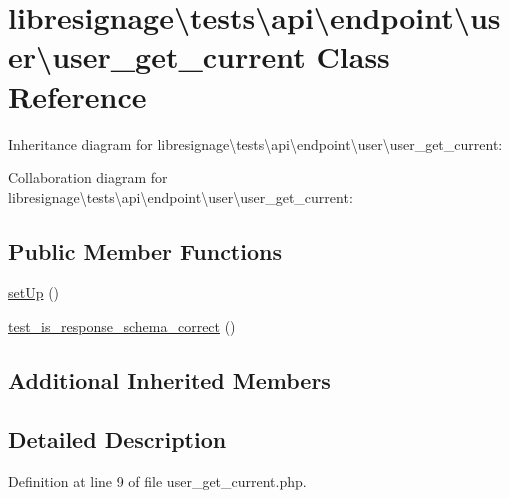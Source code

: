 \hypertarget{classlibresignage_1_1tests_1_1api_1_1endpoint_1_1user_1_1user__get__current}{}\section{libresignage\textbackslash{}tests\textbackslash{}api\textbackslash{}endpoint\textbackslash{}user\textbackslash{}user\+\_\+get\+\_\+current Class Reference}
\label{classlibresignage_1_1tests_1_1api_1_1endpoint_1_1user_1_1user__get__current}


Inheritance diagram for libresignage\textbackslash{}tests\textbackslash{}api\textbackslash{}endpoint\textbackslash{}user\textbackslash{}user\+\_\+get\+\_\+current\+:


Collaboration diagram for libresignage\textbackslash{}tests\textbackslash{}api\textbackslash{}endpoint\textbackslash{}user\textbackslash{}user\+\_\+get\+\_\+current\+:
\subsection*{Public Member Functions}
\begin{DoxyCompactItemize}
\item 
\hyperlink{classlibresignage_1_1tests_1_1api_1_1endpoint_1_1user_1_1user__get__current_a4178043e41ca360e76f40db2411060a7}{set\+Up} ()
\item 
\hyperlink{classlibresignage_1_1tests_1_1api_1_1endpoint_1_1user_1_1user__get__current_ac1ee7b4f80785d93c4e1b117cb19a021}{test\+\_\+is\+\_\+response\+\_\+schema\+\_\+correct} ()
\end{DoxyCompactItemize}
\subsection*{Additional Inherited Members}


\subsection{Detailed Description}


Definition at line 9 of file user\+\_\+get\+\_\+current.\+php.




